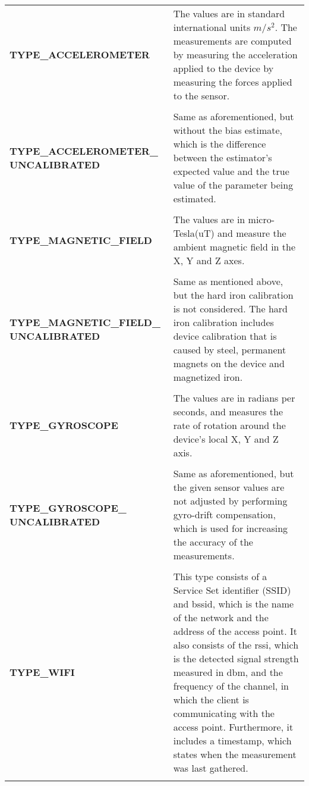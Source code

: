 \begin{longtable}{ p{}  p{}}

\textbf{TYPE\_ACCELEROMETER} & The values are in standard international units $m/s^2$. The measurements are computed by measuring the acceleration applied to the device by measuring the forces applied to the sensor\cite{sensorevent}.
\\\\

\textbf{TYPE\_ACCELEROMETER\_ \newline UNCALIBRATED} & Same as aforementioned, but without the bias estimate, which is the difference between the estimator's expected value and the true value of the parameter being estimated\cite{sensorevent}.
\\\\

\textbf{TYPE\_MAGNETIC\_FIELD} & The values are in micro-Tesla(uT) and measure the ambient magnetic field in the X, Y and Z axes\cite{sensorevent}.
\\\\


\textbf{TYPE\_MAGNETIC\_FIELD\_ \newline UNCALIBRATED} & Same as mentioned above, but the hard iron calibration is not considered. The hard iron calibration includes device calibration that is caused by steel, permanent magnets on the device and magnetized iron\cite{sensorevent}.
\\\\


\textbf{TYPE\_GYROSCOPE} & The values are in radians per seconds, and measures the rate of rotation around the device's local X, Y and Z axis\cite{sensorevent}.
\\\\

\textbf{TYPE\_GYROSCOPE\_ \newline UNCALIBRATED} & Same as aforementioned, but the given sensor values are not adjusted by performing gyro-drift compensation, which is used for increasing the accuracy of the measurements\cite{sensorevent}.
\\\\

\textbf{TYPE\_WIFI} &  This type consists of a Service Set identifier (SSID) and \gls{bssid}, which is the name of the network and the address of the access point. It also consists of the \gls{rssi}, which is the detected signal strength measured in \gls{dbm}, and the frequency of the channel, in which the client is communicating with the access point. Furthermore, it includes a timestamp, which states when the measurement was last gathered.\cite{wifiandroid}
\\\\


\end{longtable}
